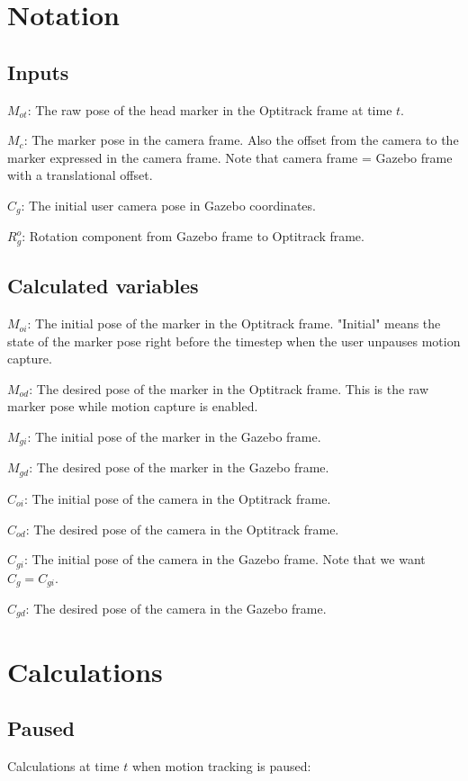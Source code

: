 \documentclass[11pt, letterpaper]{article}
\begin{document}
\section{Notation}
\subsection{Inputs}

$M_{ot}$: The raw pose of the head marker in the Optitrack frame at time $t$.

$M_c$: The marker pose in the camera frame. Also the offset from the camera to the marker expressed in the camera frame. Note that camera frame = Gazebo frame with a translational offset.

$C_g$: The initial user camera pose in Gazebo coordinates.

$R^o_g$: Rotation component from Gazebo frame to Optitrack frame.

\subsection{Calculated variables}

$M_{oi}$: The initial pose of the marker in the Optitrack frame. "Initial" means the state of the marker pose right before the timestep when the user unpauses motion capture.

$M_{od}$: The desired pose of the marker in the Optitrack frame. This is the raw marker pose while motion capture is enabled.

$M_{gi}$: The initial pose of the marker in the Gazebo frame.

$M_{gd}$: The desired pose of the marker in the Gazebo frame.

$C_{oi}$: The initial pose of the camera in the Optitrack frame.

$C_{od}$: The desired pose of the camera in the Optitrack frame.

$C_{gi}$: The initial pose of the camera in the Gazebo frame. Note that we want $C_g = C_{gi}$.

$C_{gd}$: The desired pose of the camera in the Gazebo frame.

\section{Calculations}
\subsection{Paused}
Calculations at time $t$ when motion tracking is paused:
\end{document}
